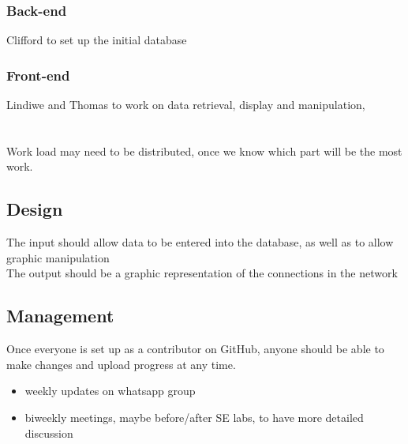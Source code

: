 \documentclass[11pt]{article}
\begin{document}
\subsubsection{Back-end}
Clifford to set up the initial database
\subsubsection{Front-end}
Lindiwe and Thomas to work on data retrieval, display and manipulation, 
\\
\\
\\
Work load may need to be distributed, once we know which part will be the most work.

\subsection{Design}
The input should allow data to be entered into the database, as well as to allow graphic manipulation\\
The output should be a graphic representation of the connections in the network

\subsection{Management}
Once everyone is set up as a contributor on GitHub, anyone should be able to make changes and upload progress at any time. 
\begin{itemize}
\item weekly updates on whatsapp group
\item biweekly meetings, maybe before/after SE labs, to have more detailed discussion
\end{itemize}
\end{document}
